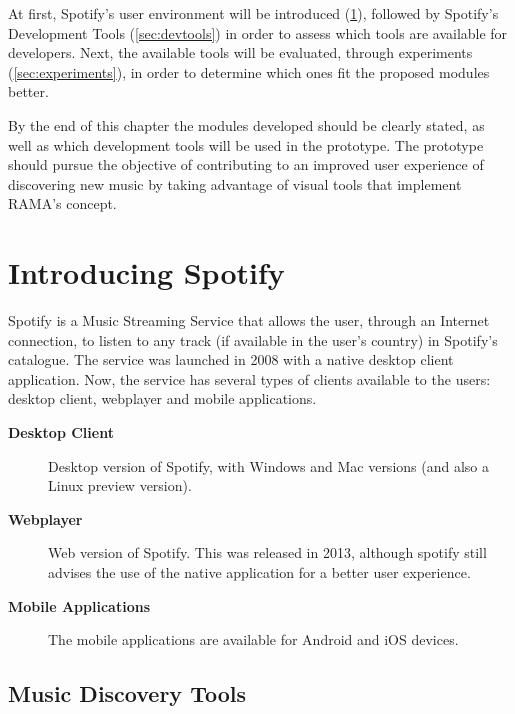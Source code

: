 At first, Spotify's user environment will be introduced (\ref{sec:spotify}), followed by Spotify's Development Tools (\ref{sec:devtools}) in order to assess which tools are available for developers.
Next, the available tools will be evaluated, through experiments (\ref{sec:experiments}), in order to determine which ones fit the proposed modules better.

By the end of this chapter the modules developed should be clearly stated, as well as which development tools will be used in the prototype.
The prototype should pursue the objective of contributing to an improved user experience of discovering new music by taking advantage of visual tools that implement RAMA's concept.

\section{Introducing Spotify} %
\label{sec:spotify}


  Spotify is a Music Streaming Service that allows the user, through an Internet connection, to listen to any track (if available in the user's country) in Spotify's catalogue.
  The service was launched in 2008 with a native desktop client application.
  Now, the service has several types of clients available to the users: desktop client, webplayer and mobile applications.

  \begin{description}
    \item[\textbf{Desktop Client}] Desktop version of Spotify, with Windows and Mac versions (and also a Linux preview version).
    \item[\textbf{Webplayer}] Web version of Spotify. This was released in 2013, although spotify still advises the use of the native application for a better user experience.
    \item[\textbf{Mobile Applications}] The mobile applications are available for Android and iOS devices.
  \end{description}

  \subsection{Music Discovery Tools} %
  \label{sub:discovery_tools}
  


